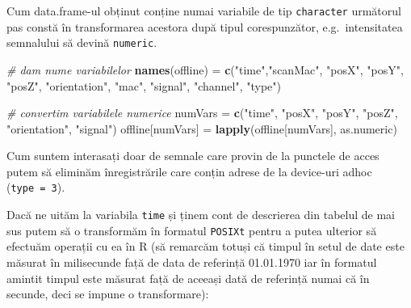 \documentclass[]{article}
\newenvironment{Shaded}{\begin{snugshade}}{\end{snugshade}}
\newcommand{\KeywordTok}[1]{\textcolor[rgb]{0.13,0.29,0.53}{\textbf{#1}}}
\newcommand{\DecValTok}[1]{\textcolor[rgb]{0.00,0.00,0.81}{#1}}
\newcommand{\StringTok}[1]{\textcolor[rgb]{0.31,0.60,0.02}{#1}}
\newcommand{\CommentTok}[1]{\textcolor[rgb]{0.56,0.35,0.01}{\textit{#1}}}
\newcommand{\OperatorTok}[1]{\textcolor[rgb]{0.81,0.36,0.00}{\textbf{#1}}}
\newcommand{\NormalTok}[1]{#1}
\begin{document}
Cum data.frame-ul obținut conține numai variabile de tip
\texttt{character} următorul pas constă în transformarea acestora după
tipul corespunzător, e.g.~intensitatea semnalului să devină
\texttt{numeric}.

\begin{Shaded}
\begin{Highlighting}[]
\CommentTok{# dam nume variabilelor}
\KeywordTok{names}\NormalTok{(offline) =}\StringTok{ }\KeywordTok{c}\NormalTok{(}\StringTok{"time"}\NormalTok{,}\StringTok{"scanMac"}\NormalTok{, }\StringTok{"posX"}\NormalTok{, }\StringTok{"posY"}\NormalTok{, }\StringTok{"posZ"}\NormalTok{, }
                   \StringTok{"orientation"}\NormalTok{, }\StringTok{"mac"}\NormalTok{, }\StringTok{"signal"}\NormalTok{, }\StringTok{"channel"}\NormalTok{, }\StringTok{"type"}\NormalTok{)}

\CommentTok{# convertim variabilele numerice}
\NormalTok{numVars =}\StringTok{ }\KeywordTok{c}\NormalTok{(}\StringTok{"time"}\NormalTok{, }\StringTok{"posX"}\NormalTok{, }\StringTok{"posY"}\NormalTok{, }\StringTok{"posZ"}\NormalTok{, }\StringTok{"orientation"}\NormalTok{,  }\StringTok{"signal"}\NormalTok{)}
\NormalTok{offline[numVars] =}\StringTok{ }\KeywordTok{lapply}\NormalTok{(offline[numVars], as.numeric)}
\end{Highlighting}
\end{Shaded}

Cum suntem interasați doar de semnale care provin de la punctele de
acces putem să eliminăm înregistrările care conțin adrese de la
device-uri adhoc (\texttt{type\ =\ 3}).

\begin{Shaded}
\end{Shaded}

Dacă ne uităm la variabila \texttt{time} și ținem cont de descrierea din
tabelul de mai sus putem să o transformăm în formatul \texttt{POSIXt}
pentru a putea ulterior să efectuăm operații cu ea în R (să remarcăm
totuși că timpul în setul de date este măsurat în milisecunde față de
data de referință 01.01.1970 iar în formatul amintit timpul este măsurat
față de aceeași dată de referință numai că în secunde, deci se impune o
transformare):
\end{document}
